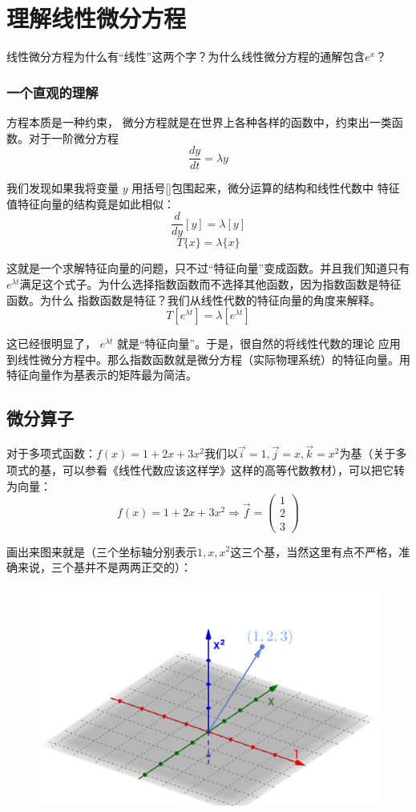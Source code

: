 \documentclass[12pt]{article}
\begin{document}
\section{理解线性微分方程\cite{How_To_Understand_Linear_Differential_Equation}}
线性微分方程为什么有“线性”这两个字？为什么线性微分方程的通解包含$e^x$？

\subsubsection{一个直观的理解\cite{Fantastic_Matrix_2}}
方程本质是一种约束， 微分方程就是在世界上各种各样的函数中，约束出一类函数。对于一阶微分方程
$$
\frac{dy}{dt} = \lambda y
$$

我们发现如果我将变量 $y$ 用括号[]包围起来，微分运算的结构和线性代数中 特征值特征向量的结构竟是如此相似：
$$
\frac{d}{dy}[y] = \lambda[y]
$$
$$
T\{x\} = \lambda\{x\}
$$

这就是一个求解特征向量的问题，只不过“特征向量”变成函数。并且我们知道只有 $e^{\lambda t}$满足这个式子。为什么选择指数函数而不选择其他函数，因为指数函数是特征函数。为什么 指数函数是特征？我们从线性代数的特征向量的角度来解释。
$$
T[e^{\lambda t}] = \lambda[e^{\lambda t}]
$$

这已经很明显了， $e^{\lambda t}$ 就是“特征向量”。于是，很自然的将线性代数的理论 应用到线性微分方程中。那么指数函数就是微分方程（实际物理系统）的特征向量。用特征向量作为基表示的矩阵最为简洁。

\subsection{微分算子}
对于多项式函数：$f(x)=1+2x+3x^2$我们以$\vec{i_{}}=1,\vec{j_{}}=x,\vec{k_{}}=x^2$为基（关于多项式的基，可以参看《线性代数应该这样学》这样的高等代数教材），可以把它转为向量：
$$
f(x)=1+2x+3x^2 \Rightarrow \vec{f_{}}=\begin{pmatrix}1\\2\\3\end{pmatrix}
$$

画出来图来就是（三个坐标轴分别表示$1,x,x^2$这三个基，当然这里有点不严格，准确来说，三个基并不是两两正交的）：
\begin{figure}[H]
    \centering
    \includegraphics[width=.5\textwidth]{fig/UnderstandLinearDifferentialEquation_1.png}
\end{figure} 
 
\end{document}
